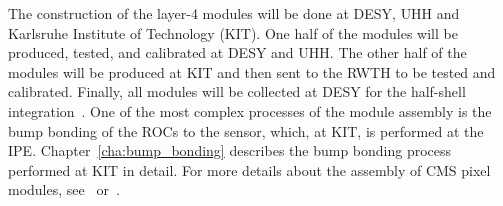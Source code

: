 The construction of the layer-4 modules will be done at \ac{DESY}, \ac{UHH} and Karlsruhe Institute of Technology (\acs{KIT}). One half of the modules will be produced, tested, and calibrated at \ac{DESY} and \ac{UHH}. The other half of the modules will be produced at \acs{KIT} and then sent to the \ac{RWTH} to be tested and calibrated. Finally, all modules will be collected at \ac{DESY} for the half-shell integration~\cite{Dom12}. One of the most complex processes of the module assembly is the bump bonding of the \ac{ROC}s to the sensor, which, at \acs{KIT}, is performed at the \ac{IPE}. Chapter~\ref{cha:bump_bonding} describes the bump bonding process performed at \acs{KIT} in detail. For more details about the assembly of \ac{CMS} pixel modules, see~\cite{CMS98} or~\cite{Koe06}.